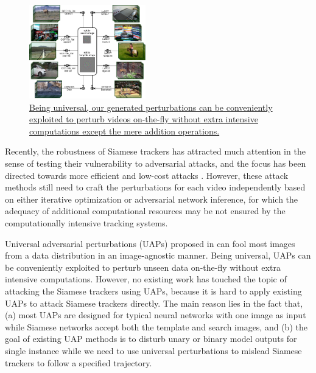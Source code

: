 \documentclass[journal]{IEEEtran}
\begin{document}
\begin{figure}[t]
  \centering
  \includegraphics[width=0.45\textwidth]{images_imperceptible/UAP_small.pdf}
  \caption{\uline{Being universal, our generated perturbations can be conveniently exploited to perturb videos on-the-fly without extra intensive computations except the mere addition operations.}} 
  \label{fig:UAP}
  \vspace{-4mm}
\end{figure}

Recently, the robustness of Siamese trackers has attracted much attention in the sense of testing their vulnerability to adversarial attacks, and the focus has been directed towards more efficient and low-cost attacks \cite{TTP,FAN,SPARK,chen2020one}. However, these attack methods still need to craft the perturbations for each video independently based on either iterative optimization or adversarial network inference, for which the adequacy of additional computational resources may be not ensured by the computationally intensive tracking systems. 

Universal adversarial perturbations (UAPs) proposed in \cite{UAP} can fool most images from a data distribution in an image-agnostic manner. Being universal, UAPs can be conveniently exploited to perturb unseen data on-the-fly without extra intensive computations. However, no existing work has touched the topic of attacking the Siamese trackers using UAPs, because it is hard to apply existing UAPs to attack Siamese trackers directly. The main reason lies in the fact that, (a) most UAPs are designed for typical neural networks with one image as input while Siamese networks accept both the template and search images, and (b) the goal of existing UAP methods is to disturb unary or binary model outputs for single instance while we need to use universal perturbations to mislead Siamese trackers to follow a specified trajectory.
 
\end{document}
